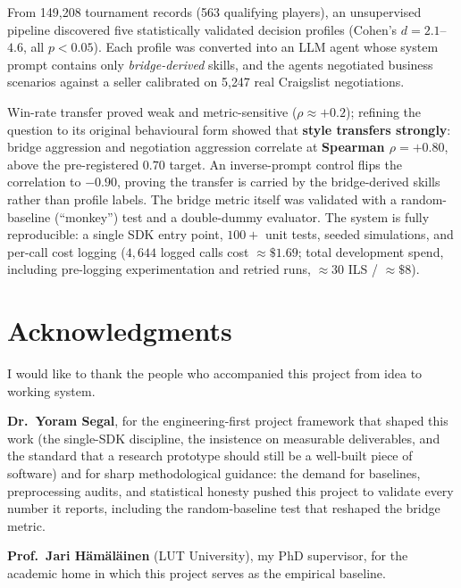\documentclass[11pt, a4paper, oneside, openany]{report}
\begin{document}
From 149{,}208 tournament records (563 qualifying players), an unsupervised
pipeline discovered five statistically validated decision profiles
(Cohen's $d = 2.1$--$4.6$, all $p<0.05$). Each profile was converted into an
LLM agent whose system prompt contains only \emph{bridge-derived} skills, and
the agents negotiated business scenarios against a seller calibrated on
5{,}247 real Craigslist negotiations.

Win-rate transfer proved weak and metric-sensitive ($\rho \approx +0.2$);
refining the question to its original behavioural form showed that
\textbf{style transfers strongly}: bridge aggression and negotiation
aggression correlate at \textbf{Spearman $\rho = +0.80$}, above the
pre-registered $0.70$ target. An inverse-prompt control flips the correlation
to $-0.90$, proving the transfer is carried by the bridge-derived skills
rather than profile labels. The bridge metric itself was validated with a
random-baseline (``monkey'') test and a double-dummy evaluator. The system is
fully reproducible: a single SDK entry point, $100{+}$ unit tests, seeded
simulations, and per-call cost logging ($4{,}644$ logged calls cost
${\approx}\$1.69$; total development spend, including pre-logging
experimentation and retried runs, ${\approx}30$ ILS / ${\approx}\$8$).

\clearpage
\chapter*{Acknowledgments}

\vspace{0.5cm}
I would like to thank the people who accompanied this project from idea to
working system.

\vspace{0.4cm}
\textbf{Dr.\ Yoram Segal}, for the engineering-first project framework that
shaped this work (the single-SDK discipline, the insistence on measurable
deliverables, and the standard that a research prototype should still be a
well-built piece of software) and for sharp methodological guidance: the
demand for baselines, preprocessing audits, and statistical honesty pushed
this project to validate every number it reports, including the
random-baseline test that reshaped the bridge metric.

\vspace{0.3cm}
\textbf{Prof.\ Jari H\"am\"al\"ainen} (LUT University), my PhD supervisor,
for the academic home in which this project serves as the empirical baseline.
\end{document}
